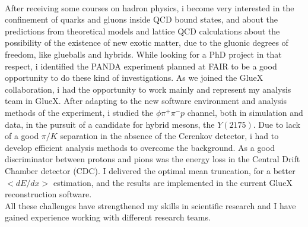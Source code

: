 \documentclass[a4paper,roman]{article}
\begin{document}
~\par After receiving some courses on hadron physics, i become very interested in the confinement of quarks and gluons inside QCD bound states, and about the predictions from theoretical models and lattice QCD calculations about the possibility of the existence of new exotic matter, due to the gluonic degrees of freedom, like glueballs and hybrids. While looking for a PhD project in that respect, i identified the PANDA experiment planned at FAIR to be a good opportunity to do these kind of investigations. As we joined the GlueX collaboration, i had the opportunity to work mainly and represent my analysis team in GlueX. After adapting to the new software environment and analysis methods of the experiment, i studied the $\phi\pi^{+}\pi^{-}p$ channel, both in simulation and data, in the pursuit of a candidate for hybrid mesons, the $Y(2175)$. Due to lack of a good $\pi/K$ separation in the absence of the Cerenkov detector, i had to develop efficient analysis methods to overcome the background. As a good discriminator between protons and pions was the energy loss in the Central Drift Chamber detector (CDC). I delivered the optimal mean truncation, for a better $<dE/dx>$ estimation, and the results are implemented in the current GlueX reconstruction software.\\
All these challenges have strengthened my skills in scientific research and I have gained experience working with different research teams.
\end{document}
